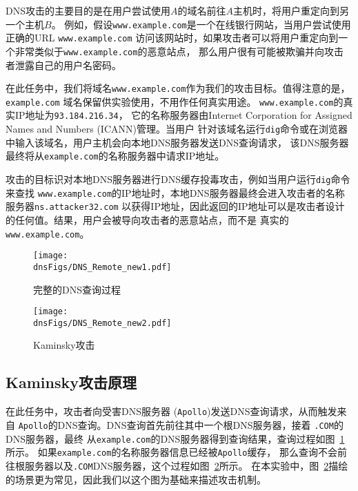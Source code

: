 DNS攻击的主要目的是在用户尝试使用$A$的域名前往$A$主机时，将用户重定向到另一个主机$B$。
例如，假设{\tt www.example.com}是一个在线银行网站，当用户尝试使用正确的URL {\tt www.example.com}
访问该网站时，如果攻击者可以将用户重定向到一个非常类似于{\tt www.example.com}的恶意站点，
那么用户很有可能被欺骗并向攻击者泄露自己的用户名密码。


在此任务中，我们将域名{\tt www.example.com}作为我们的攻击目标。值得注意的是， {\tt example.com}
域名保留供实验使用，不用作任何真实用途。 {\tt www.example.com}的真实IP地址为{\tt 93.184.216.34}，
它的名称服务器由Internet Corporation for Assigned Names and Numbers (ICANN)管理。当用户
针对该域名运行{\tt dig}命令或在浏览器中输入该域名，用户主机会向本地DNS服务器发送DNS查询请求，
该DNS服务器最终将从{\tt example.com}的名称服务器中请求IP地址。


攻击的目标识对本地DNS服务器进行DNS缓存投毒攻击，例如当用户运行{\tt dig}命令来查找
{\tt www.example.com}的IP地址时，本地DNS服务器最终会进入攻击者的名称服务器{\tt ns.attacker32.com}
以获得IP地址，因此返回的IP地址可以是攻击者设计的任何值。结果，用户会被导向攻击者的恶意站点，而不是
真实的{\tt www.example.com}。




\begin{figure}[htb]
\centering
\texttt{[image: \\dnsFigs/DNS\_Remote\_new1.pdf]}
\caption{完整的DNS查询过程} 
\label{fig:flow_diagram1}
\end{figure}


\begin{figure}[htb]
\centering
\texttt{[image: \\dnsFigs/DNS\_Remote\_new2.pdf]}
\caption{Kaminsky攻击}
\label{fig:flow_diagram2}
\end{figure}



\subsection{Kaminsky攻击原理}

在此任务中，攻击者向受害DNS服务器 ({\tt Apollo})发送DNS查询请求，从而触发来自
{\tt Apollo}的DNS查询。DNS查询首先前往其中一个根DNS服务器，接着 {\tt .COM}的DNS服务器，最终
从{\tt example.com}的DNS服务器得到查询结果，查询过程如图~\ref{fig:flow_diagram1}所示。
如果{\tt example.com}的名称服务器信息已经被{\tt Apollo}缓存，
那么查询不会前往根服务器以及{\tt .COM}DNS服务器，这个过程如图~\ref{fig:flow_diagram2}所示。
在本实验中，图~\ref{fig:flow_diagram2}描绘的场景更为常见，因此我们以这个图为基础来描述攻击机制。


